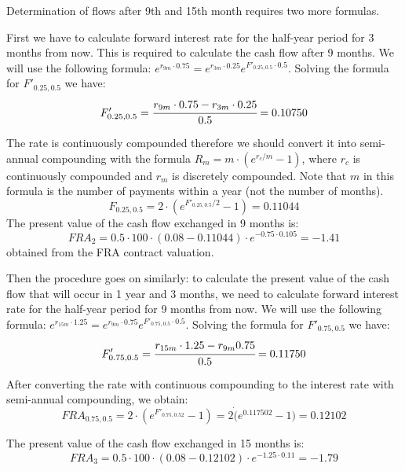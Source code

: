 \documentclass[12pt,a4paper]{exam}
\begin{document}
\begin{questions}
\begin{solution}
Determination of flows after 9th and 15th month requires two more formulas.

First we have to calculate forward interest rate for the half-year period for 3 months from now. This is required to calculate the cash flow after 9 months. We will use the following formula: $e^{r_{9m}\cdot0.75}=e^{r_{3m}\cdot0.25}e^{F'_{0.25, 0.5}\cdot 0.5}$. Solving the formula for $F'_{0.25, 0.5}$ we have:
\begin{equation*}
F'_{0.25, 0.5}=\cfrac{r_{9m}\cdot 0.75-r_{3m}\cdot0.25}{0.5}=0.10750
\end{equation*}

The rate is continuously compounded therefore we should convert it into semi-annual compounding with the formula $R_m = m\cdot(e^{r_c/m}-1)$, where $r_c$ is continuously compounded and $r_m$ is discretely compounded. Note that $m$ in this formula is the number of payments within a year (not the number of months).
\begin{equation*}
F_{0.25, 0.5}=2\cdot(e^{F'_{0.25,0.5}/2}-1)=0.11044
\end{equation*}
The present value of the cash flow exchanged in 9 months is:
\begin{equation*}
FRA_2=0.5\cdot100\cdot(0.08-0.11044)\cdot e^{-0.75\cdot0.105}=-1.41
\end{equation*}
obtained from the FRA contract valuation.

Then the procedure goes on similarly: to calculate the present value of the cash flow that will occur in 1 year and 3 months, we need to calculate forward interest rate for the half-year period for 9 months from now. We will use the following formula: $e^{r_{15m}\cdot 1.25}=e^{r_{9m}\cdot 0.75}e^{F'_{0.75, 0.5}\cdot 0.5}$. Solving the formula for $F'_{0.75, 0.5}$
 we have:
\begin{equation*}
F'_{0.75, 0.5}=\cfrac{r_{15m}\cdot1.25-r_{9m}0.75}{0.5}=0.11750
\end{equation*}

After converting the rate with continuous compounding to the interest rate with semi-annual compounding, we obtain:
\begin{equation*}
FRA_{0.75,0.5}=2\cdot(e^{F'_{0.75,0.52}}-1)=2\dot(e^0.117502-1)=0.12102
\end{equation*}

The present value of the cash flow exchanged in 15 months is:
\begin{equation*}
FRA_3=0.5\cdot100\cdot(0.08-0.12102)\cdot e^{-1.25\cdot0.11}=-1.79
\end{equation*}


\end{solution}
\end{questions}
\end{document}
